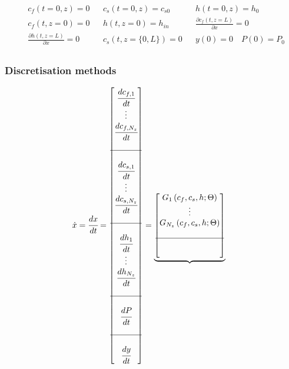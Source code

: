 \documentclass[a4paper,fleqn]{cas-dc}
\begin{document}
		{\footnotesize
			\begin{align*}
				&c_f(t = 0, z) = 0  && c_s(t = 0, z) = c_{s0} && h(t = 0, z) = h_0 \\
				&c_f(t,   z=0) = 0  && h(t, z=0) = h_{in}  && \frac{\partial c_f(t,z=L)}{\partial x} = 0 \\
				&\frac{\partial h(t,z=L)}{\partial x} = 0   && c_s(t, z=\{0,L\}) = 0 && y(0) = 0 \quad P(0) = P_0 \\
		\end{align*} }
		
		\subsubsection{Discretisation methods}
		
		\begin{figure}[!h]
			\centering
			{\footnotesize
				\begin{align*}
					\dot{x} &= \cfrac{d x}{d t} = 
					\begin{bmatrix}
						\cfrac{d c_{f,1}}{d t} 	  \\
						\vdots					  \\
						\cfrac{d c_{f,N_z}}{d t} \\
						\\ \hline \\
						\cfrac{d c_{s,1}}{d t} 	  \\
						\vdots					  \\
						\cfrac{d c_{s,N_z}}{d t} \\
						\\ \hline \\
						\cfrac{d h_1}{d t} 	  \\
						\vdots 					  \\
						\cfrac{d h_{N_z}}{d t} \\
						\\ \hline \\
						\cfrac{d P}{d t} \\
						\\ \hline \\
						\cfrac{d y}{d t}
					\end{bmatrix}
					=
					\underbrace{\begin{bmatrix}
							G_1 \left( c_f,c_s,h; \Theta \right)\\ 
							\vdots\\ 
							G_{N_z} \left( c_f,c_s,h; \Theta \right)\\ 
							\\ \hline \\ \\

\end{bmatrix}}
\end{align*}}
\end{figure}
\end{document}

